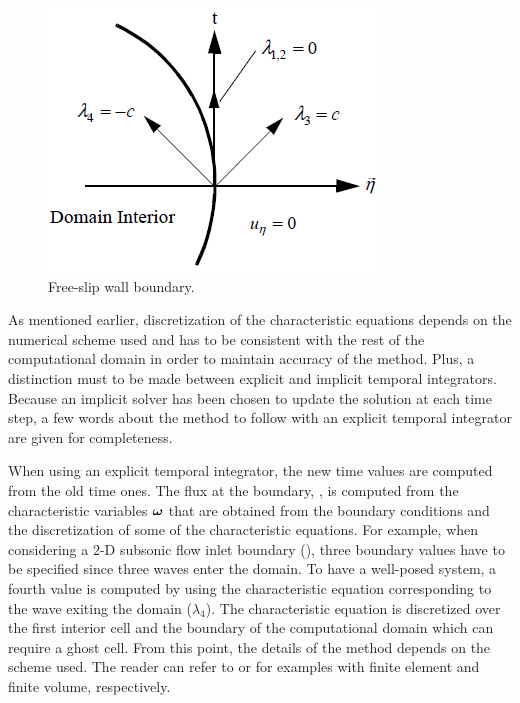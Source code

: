 %
\begin{figure}[H]
\centering
\includegraphics[]{figures/free_slip_wall_bc.png}
\caption{Free-slip wall boundary.\label{fig:wall_bc}}
\end{figure}
%
As mentioned earlier, discretization of the characteristic equations depends on the numerical scheme used and has to be consistent with the rest of the computational domain in order to maintain accuracy of the method. Plus, a distinction must to be made between explicit and implicit temporal integrators. Because an implicit solver has been chosen to update the solution at each time step, a few words about the method to follow with an explicit temporal integrator are given for completeness. 

When using an explicit temporal integrator, the new time values are computed from the old time ones. The flux at the boundary, , is computed from the characteristic variables $\boldsymbol\omega$ that are obtained from the boundary conditions and the discretization of some of the characteristic equations. For example, when considering a $2$-D subsonic flow inlet boundary (), three boundary values have to be specified since three waves enter the domain. To have a well-posed system, a fourth value is computed by using the characteristic equation corresponding to the wave exiting the domain ($\lambda_4$). The characteristic equation is discretized over the first interior cell and the boundary of the computational domain which can require a ghost cell. From this point, the details of the method depends on the scheme used. The reader can refer to \cite{RichThesis} or \cite{SEM} for examples with finite element and finite volume, respectively. 

